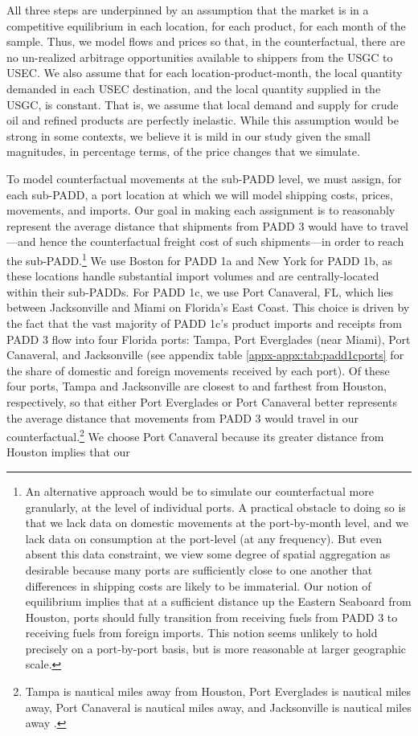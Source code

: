 \documentclass[12pt]{article}
\begin{document}
All three steps are underpinned by an assumption that the market is in a competitive equilibrium in each location, for each product, for each month of the sample. Thus, we model flows and prices so that, in the counterfactual, there are no un-realized arbitrage opportunities available to shippers from the USGC to USEC. We also assume that for each location-product-month, the local quantity demanded in each USEC destination, and the local quantity supplied in the USGC, is constant. That is, we assume that local demand and supply for crude oil and refined products are perfectly inelastic. While this assumption would be strong in some contexts, we believe it is mild in our study given the small magnitudes, in percentage terms, of the price changes that we simulate.

To model counterfactual movements at the sub-PADD level, we must assign, for each sub-PADD, a port location at which we will model shipping costs, prices, movements, and imports. Our goal in making each assignment is to reasonably represent the average distance that shipments from PADD 3 would have to travel---and hence the counterfactual freight cost of such shipments---in order to reach the sub-PADD.\footnote{An alternative approach would be to simulate our counterfactual more granularly, at the level of individual ports. A practical obstacle to doing so is that we lack data on domestic movements at the port-by-month level, and we lack data on consumption at the port-level (at any frequency). But even absent this data constraint, we view some degree of spatial aggregation as desirable because many ports are sufficiently close to one another that differences in shipping costs are likely to be immaterial. Our notion of equilibrium implies that at a sufficient distance up the Eastern Seaboard from Houston, ports should fully transition from receiving fuels from PADD 3 to receiving fuels from foreign imports. This notion seems unlikely to hold precisely on a port-by-port basis, but is more reasonable at larger geographic scale.} We use Boston for PADD 1a and New York for PADD 1b, as these locations handle substantial import volumes and are centrally-located within their sub-PADDs. For PADD 1c, we use Port Canaveral, FL, which lies between Jacksonville and Miami on Florida's East Coast. This choice is driven by the fact that the vast majority of PADD 1c's product imports and receipts from PADD 3 flow into four Florida ports: Tampa, Port Everglades (near Miami), Port Canaveral, and Jacksonville (see appendix table \ref{appx-appx:tab:padd1cports} for the share of domestic and foreign movements received by each port). Of these four ports, Tampa and Jacksonville are closest to and farthest from Houston, respectively, so that either Port Everglades or Port Canaveral better represents the average distance that movements from PADD 3 would travel in our counterfactual.\footnote{Tampa is nautical miles away from Houston, Port Everglades is nautical miles away, Port Canaveral is nautical miles away, and Jacksonville is nautical miles away \citep{Searoutes2023}.}  We choose Port Canaveral because its greater distance from Houston implies that our 
\end{document}
